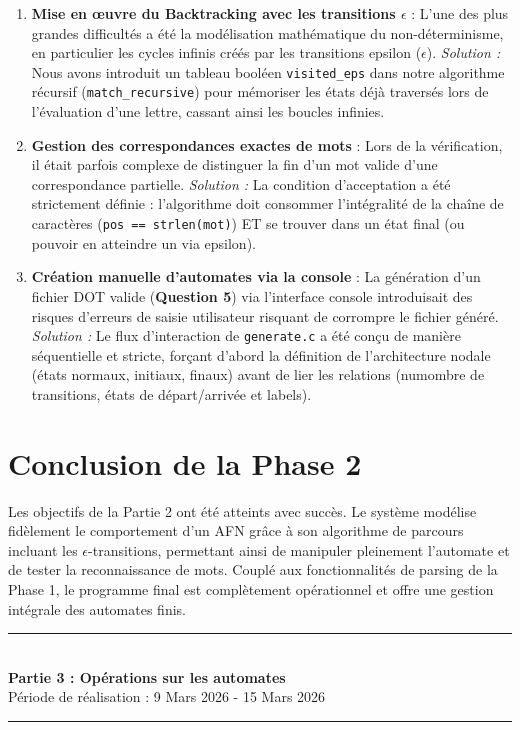 \documentclass[12pt,a4paper]{article}
\newcommand{\HRule}{\rule{\linewidth}{0.5mm}}
\begin{document}
\begin{enumerate}
\item \textbf{Mise en œuvre du Backtracking avec les transitions $\epsilon$} : 
L'une des plus grandes difficultés a été la modélisation mathématique du non-déterminisme, en particulier les cycles infinis créés par les transitions epsilon ($\epsilon$).
\textit{Solution :} Nous avons introduit un tableau booléen \texttt{visited\_eps} dans notre algorithme récursif (\texttt{match\_recursive}) pour mémoriser les états déjà traversés lors de l'évaluation d'une lettre, cassant ainsi les boucles infinies.
\item \textbf{Gestion des correspondances exactes de mots} : 
Lors de la vérification, il était parfois complexe de distinguer la fin d'un mot valide d'une correspondance partielle.
\textit{Solution :} La condition d'acceptation a été strictement définie : l'algorithme doit consommer l'intégralité de la chaîne de caractères (\texttt{pos == strlen(mot)}) ET se trouver dans un état final (ou pouvoir en atteindre un via epsilon).
\item \textbf{Création manuelle d'automates via la console} : 
La génération d'un fichier DOT valide (\textbf{Question 5}) via l'interface console introduisait des risques d'erreurs de saisie utilisateur risquant de corrompre le fichier généré.
\textit{Solution :} Le flux d'interaction de \texttt{generate.c} a été conçu de manière séquentielle et stricte, forçant d'abord la définition de l'architecture nodale (états normaux, initiaux, finaux) avant de lier les relations (numombre de transitions, états de départ/arrivée et labels).
\end{enumerate}

\section{Conclusion de la Phase 2}
Les objectifs de la Partie 2 ont été atteints avec succès. Le système modélise fidèlement le comportement d'un AFN grâce à son algorithme de parcours incluant les $\epsilon$-transitions, permettant ainsi de manipuler pleinement l'automate et de tester la reconnaissance de mots. Couplé aux fonctionnalités de parsing de la Phase 1, le programme final est complètement opérationnel et offre une gestion intégrale des automates finis.

\newpage
\begin{center}
\vspace*{1cm}
\HRule \\[0.5cm]
\textbf{\huge Partie 3 : Opérations sur les automates} \\[0.5cm]
\Large Période de réalisation : 9 Mars 2026 - 15 Mars 2026 \\
\HRule \\
\vspace*{1cm}
\end{center}
\end{document}
